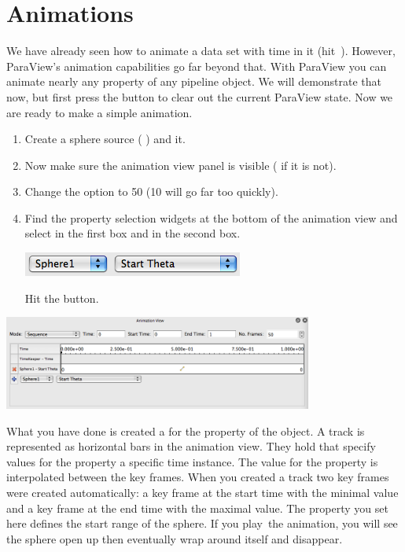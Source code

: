 \section{Animations}

We have already seen how to animate a data set with time in it
(hit~\vcrPlay).  However, ParaView’s animation capabilities go far beyond
that.  With ParaView you can animate nearly any property of any pipeline
object.  We will demonstrate that now, but first press the \disconnect
button to clear out the current ParaView state.  Now we are ready to make a
simple animation.

\begin{enumerate}
\item Create a sphere source ( \ra {}) and \apply it.
\item Now make sure the animation view panel is visible ( \ra
   if it is not).
\item Change the  option to 50 (10 will go far too quickly).
\item Find the property selection widgets at the bottom of the animation
  view and select  in the first box and  in
  the second box.
  \begin{inlinefig}
    \includegraphics[height=1.5\baselineskip]{images/AddStartThetaTrack}
  \end{inlinefig}
  Hit the  button.
  \savecounter
\end{enumerate}

\begin{inlinefig}
  \includegraphics[width=4in]{images/BuildAnimation1}
\end{inlinefig}

What you have done is created a  for the 
property of the  object.  A track is represented as horizontal
bars in the animation view.  They hold  that specify
values for the property a specific time instance.  The value for the
property is interpolated between the key frames.  When you created a track
two key frames were created automatically: a key frame at the start time
with the minimal value and a key frame at the end time with the maximal
value.  The property you set here defines the start range of the sphere.
If you play~\vcrPlay the animation, you will see the sphere open up then
eventually wrap around itself and disappear.

